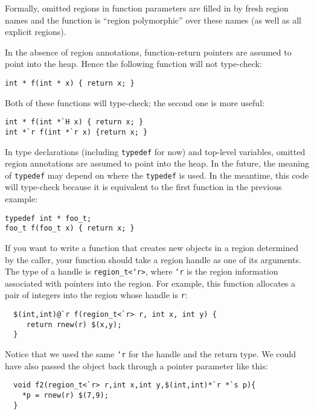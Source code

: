 Formally, omitted regions in function parameters are filled in by
fresh region names and the function is ``region polymorphic'' over
these names (as well as all explicit regions).

In the absence of region annotations, function-return pointers are
assumed to point into the heap.  Hence the following function will not
type-check:
\begin{verbatim}
int * f(int * x) { return x; }
\end{verbatim}
Both of these functions will type-check; the second one is more
useful:
\begin{verbatim}
int * f(int *`H x) { return x; }
int *`r f(int *`r x) {return x; }
\end{verbatim}

In type declarations (including \texttt{typedef} for now) and
top-level variables, omitted region annotations are assumed to point
into the heap.  In the future, the meaning of \texttt{typedef} may
depend on where the \texttt{typedef} is used.  In the meantime, this
code will type-check because it is equivalent to the first function in
the previous example:
\begin{verbatim}
typedef int * foo_t;
foo_t f(foo_t x) { return x; }
\end{verbatim}


If you want to write a function that creates new objects in a region
determined by the caller, your function should take a region handle as
one of its arguments.  The type of a handle is \texttt{region_t<`r>},
where \texttt{`r} is the region information associated with pointers
into the region.  For example, this function allocates a pair of
integers into the region whose handle is \texttt{r}:
\begin{verbatim}
  $(int,int)@`r f(region_t<`r> r, int x, int y) { 
     return rnew(r) $(x,y);
  }
\end{verbatim}
Notice that we used the same \texttt{`r} for the handle and the return
type.  We could have also passed the object back through a pointer
parameter like this:
\begin{verbatim}
  void f2(region_t<`r> r,int x,int y,$(int,int)*`r *`s p){ 
    *p = rnew(r) $(7,9); 
  }
\end{verbatim}

